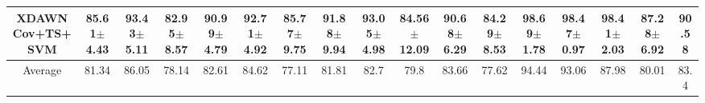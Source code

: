 \begin{adjustbox}{scale=.7}
\begin{tabular}{c|ccccccccccccccc|c}
    \rowcolor{YellowOrange!10} XDAWNCov+TS+SVM &                   85.61$\pm$4.43 & \textbf{93.43}$\pm$\textbf{5.11} &                   82.95$\pm$8.57 & \textbf{90.99}$\pm$\textbf{4.79} & \textbf{92.71}$\pm$\textbf{4.92} &                   85.77$\pm$9.75 & \textbf{91.88}$\pm$\textbf{9.94} & \textbf{93.05}$\pm$\textbf{4.98} & \textbf{84.56}$\pm$\textbf{12.09} & \textbf{90.68}$\pm$\textbf{6.29} &                   84.29$\pm$8.53 & \textbf{98.69}$\pm$\textbf{1.78} & \textbf{98.47}$\pm$\textbf{0.97} & \textbf{98.41}$\pm$\textbf{2.03} &                   87.28$\pm$6.92 & \textbf{90.58} \\
    \hline
    \rowcolor{YellowOrange!50} Average &                            81.34 &                            86.05 &                            78.14 &                            82.61 &                            84.62 &                            77.11 &                            81.81 &                             82.7 &                              79.8 &                            83.66 &                            77.62 &                            94.44 &                            93.06 &                            87.98 &                            80.01 &           83.4 \\
    \hline
\end{tabular}\end{adjustbox}
